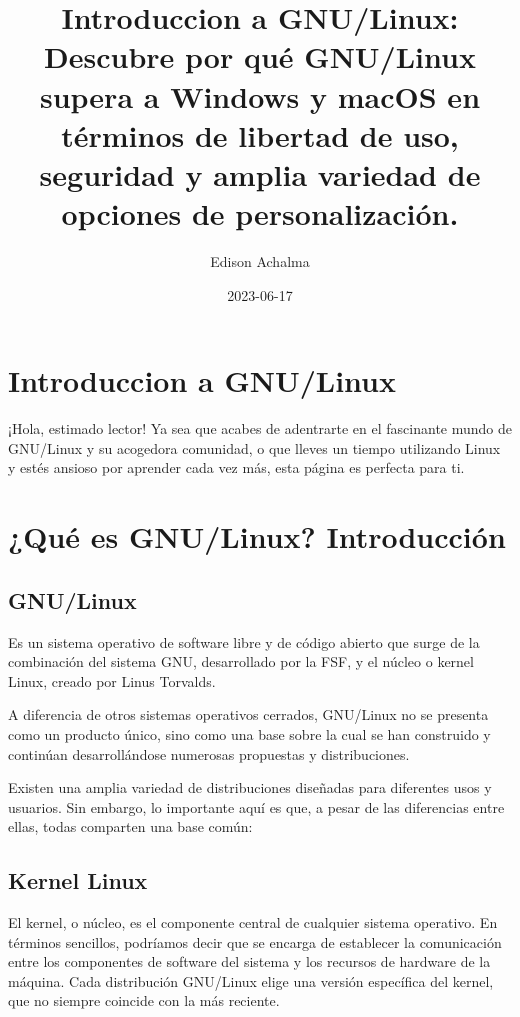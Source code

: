 \documentclass[
  jou,
  floatsintext,
  longtable,
  a4paper,
  nolmodern,
  notxfonts,
  notimes,
  colorlinks=true,linkcolor=blue,citecolor=blue,urlcolor=blue]{apa7}
\title{Introduccion a GNU/Linux: Descubre por qué GNU/Linux supera a
Windows y macOS en términos de libertad de uso, seguridad y amplia
variedad de opciones de personalización.}
\author{Edison Achalma}
\affiliation{
{Escuela Profesional de Economía, Universidad Nacional de San Cristóbal
de Huamanga}}
\date{2023-06-17}
\begin{document}
\maketitle

\hypertarget{toc}{}
\tableofcontents
\newpage
\section[Introduction]{Introduccion a GNU/Linux}

\setcounter{secnumdepth}{5}

\setlength\LTleft{0pt}


¡Hola, estimado lector! Ya sea que acabes de adentrarte en el fascinante
mundo de GNU/Linux y su acogedora comunidad, o que lleves un tiempo
utilizando Linux y estés ansioso por aprender cada vez más, esta página
es perfecta para ti.

\section{¿Qué es GNU/Linux?
Introducción}\label{quuxe9-es-gnulinux-introducciuxf3n}

\subsection{GNU/Linux}\label{gnulinux}

Es un sistema operativo de software libre y de código abierto que surge
de la combinación del sistema GNU, desarrollado por la FSF, y el núcleo
o kernel Linux, creado por Linus Torvalds.

A diferencia de otros sistemas operativos cerrados, GNU/Linux no se
presenta como un producto único, sino como una base sobre la cual se han
construido y continúan desarrollándose numerosas propuestas y
distribuciones.

Existen una amplia variedad de distribuciones diseñadas para diferentes
usos y usuarios. Sin embargo, lo importante aquí es que, a pesar de las
diferencias entre ellas, todas comparten una base común:

\subsection{Kernel Linux}\label{kernel-linux}

El kernel, o núcleo, es el componente central de cualquier sistema
operativo. En términos sencillos, podríamos decir que se encarga de
establecer la comunicación entre los componentes de software del sistema
y los recursos de hardware de la máquina. Cada distribución GNU/Linux
elige una versión específica del kernel, que no siempre coincide con la
más reciente.
\end{document}

